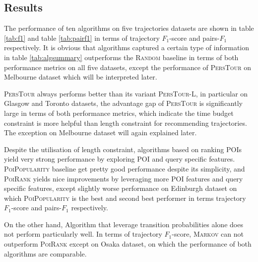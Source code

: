 \subsection{Results}
\label{sec:result}


The performance of ten algorithms on five trajectories datasets are shown in table \ref{tab:f1}
and table \ref{tab:pairf1} in terms of trajectory $F_1$-score and pairs-$F_1$ respectively.
%
It is obvious that algorithms captured a certain type of information in table \ref{tab:algsummary}
outperforms the \textsc{Random} baseline in terms of both performance metrics on all five datasets,
except the performance of \textsc{PersTour}\cite{ijcai15} on Melbourne dataset which will be interpreted later.

\textsc{PersTour}\cite{ijcai15} always performs better than its variant \textsc{PersTour-L},
in particular on Glasgow and Toronto datasets, the advantage gap of \textsc{PersTour}
is significantly large in terms of both performance metrics,
%
which indicate the time budget constraint is more helpful than length constraint for recommending trajectories.
The exception on Melbourne dataset will again explained later.

Despite the utilisation of length constraint, algorithms based on ranking POIs yield very strong performance
by exploring POI and query specific features.
%
\textsc{PoiPopularity} baseline get pretty good performance despite its simplicity,
and \textsc{PoiRank} yields nice improvements by leveraging more POI features and query specific features,
except slightly worse performance on Edinburgh dataset on which \textsc{PoiPopularity} is the best and
second best performer in terms trajectory $F_1$-score and pairs-$F_1$ respectively.

On the other hand, Algorithm that leverage transition probabilities alone does not perform particularly well.
%
In terms of trajectory $F_1$-score,
\textsc{Markov} can not outperform \textsc{PoiRank} except on Osaka dataset,
on which the performance of both algorithms are comparable.

